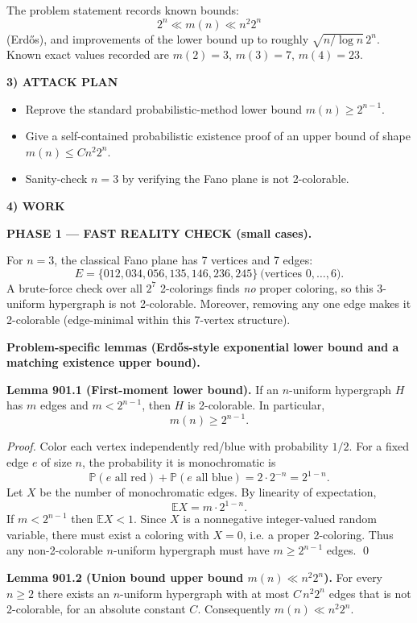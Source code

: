The problem statement records known bounds:
\[2^n\ll m(n)\ll n^2 2^n\]
(Erd\H{o}s), and improvements of the lower bound up to roughly
$\sqrt{n/\log n}\,2^n$.
Known exact values recorded are $m(2)=3$, $m(3)=7$, $m(4)=23$.

\medskip
\noindent\textbf{3) ATTACK PLAN}

\begin{itemize}
\item Reprove the standard probabilistic-method lower bound $m(n)\ge 2^{n-1}$.
\item Give a self-contained probabilistic existence proof of an upper bound of
shape $m(n)\le C n^2 2^n$.
\item Sanity-check $n=3$ by verifying the Fano plane is not 2-colorable.
\end{itemize}

\medskip
\noindent\textbf{4) WORK}

\textbf{PHASE 1 — FAST REALITY CHECK (small cases).}

For $n=3$, the classical Fano plane has 7 vertices and 7 edges:
\[
E=\{012,034,056,135,146,236,245\}\ \text{(vertices }0,\dots,6\text{).}
\]
A brute-force check over all $2^7$ 2-colorings finds \emph{no} proper coloring,
so this 3-uniform hypergraph is not 2-colorable.
Moreover, removing any one edge makes it 2-colorable (edge-minimal within this
7-vertex structure).

\medskip
\textbf{Problem-specific lemmas (Erd\H{o}s-style exponential lower bound and a
matching existence upper bound).}

\medskip
\noindent\textbf{Lemma 901.1 (First-moment lower bound).}
If an $n$-uniform hypergraph $H$ has $m$ edges and $m<2^{n-1}$, then $H$ is
2-colorable. In particular,
\[ m(n)\ge 2^{n-1}. \]

\emph{Proof.}
Color each vertex independently red/blue with probability $1/2$.
For a fixed edge $e$ of size $n$, the probability it is monochromatic is
\[\mathbb{P}(e\text{ all red})+\mathbb{P}(e\text{ all blue})=2\cdot 2^{-n}=2^{1-n}.
\]
Let $X$ be the number of monochromatic edges. By linearity of expectation,
\[ \mathbb{E}X = m\cdot 2^{1-n}. \]
If $m<2^{n-1}$ then $\mathbb{E}X<1$. Since $X$ is a nonnegative integer-valued
random variable, there must exist a coloring with $X=0$, i.e. a proper 2-coloring.
Thus any non-2-colorable $n$-uniform hypergraph must have $m\ge 2^{n-1}$ edges.
\qed

\medskip
\noindent\textbf{Lemma 901.2 (Union bound upper bound $m(n)\ll n^2 2^n$).}
For every $n\ge 2$ there exists an $n$-uniform hypergraph with at most
$C\,n^2 2^n$ edges that is not 2-colorable, for an absolute constant $C$.
Consequently $m(n)\ll n^2 2^n$.

